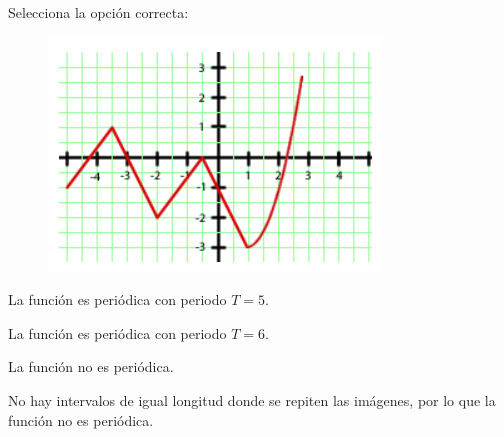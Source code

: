\begin{scq}
	Selecciona la opción correcta:\\
	\begin{figure}
		\includegraphics{samples/propiedades/periodicidad3.jpg}
	\end{figure}
	\begin{choices}
		\begin{choice}
			La función es periódica con periodo $T=5$.	
		\end{choice}
		\begin{choice}
			La función es periódica con periodo $T=6$.
		\end{choice}	
		\begin{choice}[x]
			La función no es periódica.
		\end{choice}
	\end{choices}
	\begin{feedback}
		No hay intervalos de igual longitud donde se repiten las imágenes, por lo que la función no es periódica.
	\end{feedback}
\end{scq}



